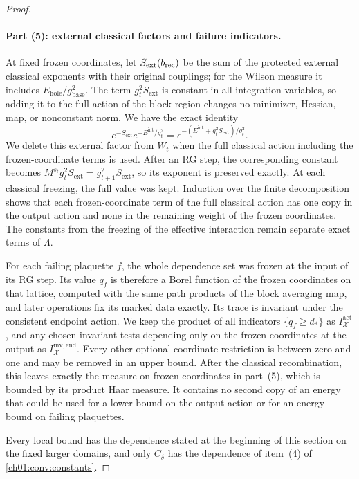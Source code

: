 \begin{proof}
\paragraph{Part (5): external classical factors and failure indicators.}
At fixed frozen coordinates, let $S_{\mathrm{ext}}(b_{\mathrm{rec}})$ be the sum of the protected external classical exponents with their original couplings; for the Wilson measure it includes $E_{\mathrm{hole}}/g_{\mathrm{base}}^2$. The term $g_t^2S_{\mathrm{ext}}$ is constant in all integration variables, so adding it to the full action of the block region changes no minimizer, Hessian, map, or nonconstant norm. We have the exact identity
\[
 e^{-S_{\mathrm{ext}}}e^{-E^{\mathrm{int}}/g_t^2}
 =e^{-(E^{\mathrm{int}}+g_t^2S_{\mathrm{ext}})/g_t^2}.
\]
We delete this external factor from $W_t$ when the full classical action including the frozen-coordinate terms is used. After an RG step, the corresponding constant becomes $M^{s_t}g_t^2S_{\mathrm{ext}}=g_{t+1}^2S_{\mathrm{ext}}$, so its exponent is preserved exactly. At each classical freezing, the full value was kept. Induction over the finite decomposition shows that each frozen-coordinate term of the full classical action has one copy in the output action and none in the remaining weight of the frozen coordinates. The constants from the freezing of the effective interaction remain separate exact terms of $\Lambda$.

For each failing plaquette $f$, the whole dependence set was frozen at the input of its RG step. Its value $q_f$ is therefore a Borel function of the frozen coordinates on that lattice, computed with the same path products of the block averaging map, and later operations fix its marked data exactly. Its trace is invariant under the consistent endpoint action. We keep the product of all indicators $\{q_f\ge d_*\}$ as $I_{\mathcal X}^{\mathrm{act}}$, and any chosen invariant tests depending only on the frozen coordinates at the output as $I_{\mathcal X}^{\mathrm{inv,end}}$. Every other optional coordinate restriction is between zero and one and may be removed in an upper bound. After the classical recombination, this leaves exactly the measure on frozen coordinates in part~(5), which is bounded by its product Haar measure. It contains no second copy of an energy that could be used for a lower bound on the output action or for an energy bound on failing plaquettes.

Every local bound has the dependence stated at the beginning of this section on the fixed larger domains, and only $C_\delta$ has the dependence of item~(4) of \cref{ch01:conv:constants}.
\end{proof}
